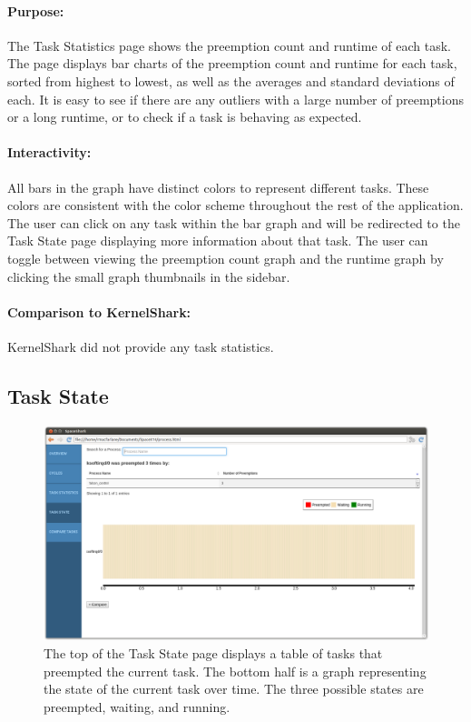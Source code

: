 \documentclass{hmcclinic}
\begin{document}
\paragraph{Purpose:}
The Task Statistics page shows the preemption count and runtime of each task.
The page displays bar charts of the preemption count and runtime for each task,
sorted from highest to lowest, as well as the averages and standard deviations
of each. It is easy to see if there are any outliers with a large number of
preemptions or a long runtime, or to check if a task is behaving as expected.

\paragraph{Interactivity:}
All bars in the graph have distinct colors to represent different tasks. These
colors are consistent with the color scheme throughout the rest of the
application. The user can click on any task within the bar graph and will be
redirected to the Task State page displaying more information about that task.
The user can toggle between viewing the preemption count graph and the runtime
graph by clicking the small graph thumbnails in the sidebar.

\paragraph{Comparison to KernelShark:} KernelShark did not provide any task statistics. 


  \subsection{Task State}

  \begin{figure}[H]
  \includegraphics[scale=0.25]{task-state-page.png}
  \caption{The top of the Task State page displays a table of tasks
  that preempted the current task. The bottom half is a graph representing the
state of the current task over time. The three possible states are preempted,
waiting, and running.}
\end{figure}
\end{document}
